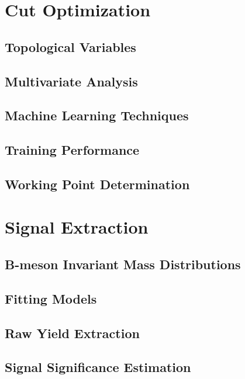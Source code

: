 \section{Cut Optimization} 

\subsection{Topological Variables}

\subsection{Multivariate Analysis}

\subsection{Machine Learning Techniques}

\subsection{Training Performance}

\subsection{Working Point Determination}

\section{Signal Extraction} 

\subsection{B-meson Invariant Mass Distributions}

\subsection{Fitting Models}

\subsection{Raw Yield Extraction}

\subsection{Signal Significance Estimation}

